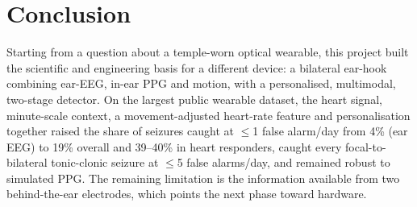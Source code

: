 \section{Conclusion}

Starting from a question about a temple-worn optical wearable, this project built the scientific and engineering basis for a different device: a bilateral ear-hook combining ear-EEG, in-ear PPG and motion, with a personalised, multimodal, two-stage detector. On the largest public wearable dataset, the heart signal, minute-scale context, a movement-adjusted heart-rate feature and personalisation together raised the share of seizures caught at $\le$1 false alarm/day from 4\% (ear EEG) to 19\% overall and 39--40\% in heart responders, caught every focal-to-bilateral tonic-clonic seizure at $\le$5 false alarms/day, and remained robust to simulated PPG. The remaining limitation is the information available from two behind-the-ear electrodes, which points the next phase toward hardware.
